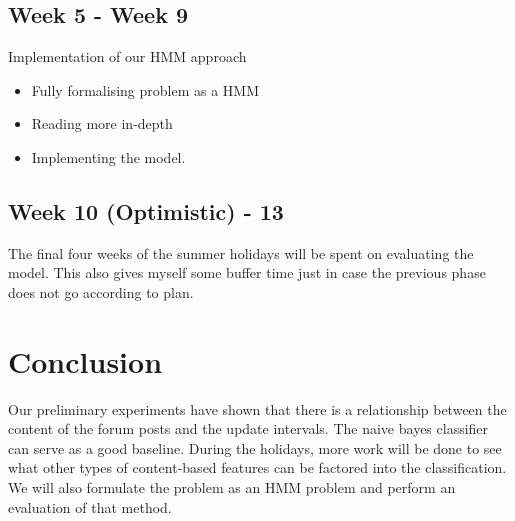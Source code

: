 \documentclass[12 pt]{article}
\begin{document}
\subsection{Week 5 - Week 9}
	Implementation of our HMM approach
	\begin{itemize}
		\item Fully formalising problem as a HMM
		\item Reading more in-depth
		\item Implementing the model.
	\end{itemize}
\subsection{Week 10 (Optimistic) - 13}
The final four weeks of the summer holidays will be spent on evaluating the model. This also gives myself some buffer time just in case the previous phase does not go according to plan.

\section{Conclusion}
Our preliminary experiments have shown that there is a relationship between the content of the forum posts and the update intervals. The naive bayes classifier can serve as a good baseline. During the holidays, more work will be done to see what other types of content-based features can be factored into the classification. We will also formulate the problem as an HMM problem and perform an evaluation of that method.







\end{document}
